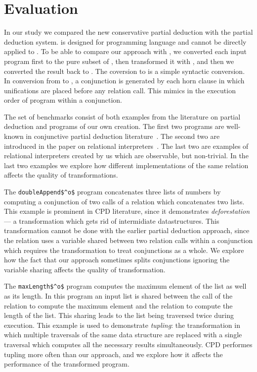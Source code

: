 \section{Evaluation}
In our study we compared the new conservative partial deduction with the \ecce partial deduction system.
\ecce is designed for \pro programming language and cannot be directly applied to \mk.
To be able to compare our approach with \ecce, we converted each input program first to the pure subset of \pro, then transformed it with \ecce, and then we converted the result back to \mk.
The coversion to \pro is a simple syntactic conversion.
In conversion from \pro to \mk, a conjunction is generated by each horn clause in which unifications are placed before any relation call.
This mimics in \mk the execution order of \pro program within a conjunction.

The set of benchmarks consist of both examples from the literature on partial deduction and programs of our own creation.
The first two programs are well-known in conjunctive partial deduction literature~\cite{de1999conjunctive}.
The second two are introduced in the paper on relational interpreters~\cite{lozov2019relational}.
The last two are examples of relational interpreters created by us which are observable, but non-trivial.
In the last two examples we explore how different implementations of the same relation affects the quality of transformations.

The \lstinline{doubleAppend$^o$} program concatenates three lists of numbers by computing a conjunction of two calls of a relation which concatenates two lists.
This example is prominent in CPD literature, since it demonstrates \emph{deforestation} --- a transformation which gets rid of intermidiate datastructures.
This transformation cannot be done with the earlier partial deduction approach, since the relation uses a variable shared between two relation calls within a conjunction which requires the transformation to treat conjunctions as a whole.
We explore how the fact that our approach sometimes splits conjunctions ignoring the variable sharing affects the quality of transformation.

The \lstinline{maxLength$^o$} program computes the maximum element of the list as well as its length.
In this program an input list is shared between the call of the relation to compute the maximum element and the relation to compute the length of the list.
This sharing leads to the list being traversed twice during execution.
This example is used to demonstrate \emph{tupling}: the transformation in which multiple traversals of the same data structure are replaced with a single traversal which computes all the necessary results simultaneously.
CPD performes tupling more often than our approach, and we explore how it affects the performance of the transformed program.

